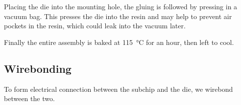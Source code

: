 Placing the die into the mounting hole, the gluing is followed by pressing in a
vacuum bag. This presses the die into the resin and may help to prevent air
pockets in the resin, which could leak into the vacuum later.

Finally the entire assembly is baked at \SI{115}{\celsius} for an hour, then
left to cool.

\subsection{Wirebonding}

To form electrical connection between the subchip and the die, we wirebond
between the two.
